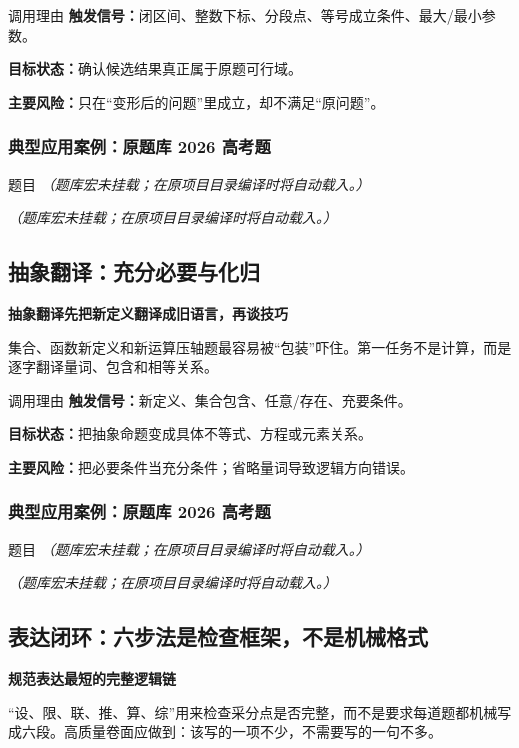 \documentclass[11pt,a4paper]{ctexart}
\newcommand{\mindsetcard}[3]{%
    \begin{tcolorbox}[breakable,colback=white,colframe=black!70,boxrule=0.8pt,arc=1mm]
    {\large\bfseries #1}\hfill{\small\bfseries #2}\par\smallskip
    #3
    \end{tcolorbox}}
\newcommand{\trigger}[1]{\textbf{触发信号：}#1}
\newcommand{\goalstate}[1]{\textbf{目标状态：}#1}
\newcommand{\risk}[1]{\textbf{主要风险：}#1}
\providecommand{\MissingPoolNotice}{\textit{（题库宏未挂载；在原项目目录编译时将自动载入。）}}
\providecommand{\qSeqMaxRatioStem}{\MissingPoolNotice}
\providecommand{\qSeqMaxRatioSolution}{\MissingPoolNotice}
\providecommand{\qFuncSubsetRelationStem}{\MissingPoolNotice}
\providecommand{\qFuncSubsetRelationSolution}{\MissingPoolNotice}
\begin{document}
\begin{decisionbox}{调用理由}
\trigger{闭区间、整数下标、分段点、等号成立条件、最大/最小参数。}\par
\goalstate{确认候选结果真正属于原题可行域。}\par
\risk{只在“变形后的问题”里成立，却不满足“原问题”。}
\end{decisionbox}

\subsubsection*{典型应用案例：原题库 2026 高考题}
\begin{lessonbriefbox}{题目}
  \qSeqMaxRatioStem
\end{lessonbriefbox}
\qSeqMaxRatioSolution

\newpage

\subsection{抽象翻译：充分必要与化归}
\mindsetcard{抽象翻译}{先把新定义翻译成旧语言，再谈技巧}{集合、函数新定义和新运算压轴题最容易被“包装”吓住。第一任务不是计算，而是逐字翻译量词、包含和相等关系。}

\begin{decisionbox}{调用理由}
\trigger{新定义、集合包含、任意/存在、充要条件。}\par
\goalstate{把抽象命题变成具体不等式、方程或元素关系。}\par
\risk{把必要条件当充分条件；省略量词导致逻辑方向错误。}
\end{decisionbox}

\subsubsection*{典型应用案例：原题库 2026 高考题}
\begin{lessonbriefbox}{题目}
  \qFuncSubsetRelationStem
\end{lessonbriefbox}
\qFuncSubsetRelationSolution

\newpage

\subsection{表达闭环：六步法是检查框架，不是机械格式}
\mindsetcard{规范表达}{最短的完整逻辑链}{“设、限、联、推、算、综”用来检查采分点是否完整，而不是要求每道题都机械写成六段。高质量卷面应做到：该写的一项不少，不需要写的一句不多。}
\end{document}
